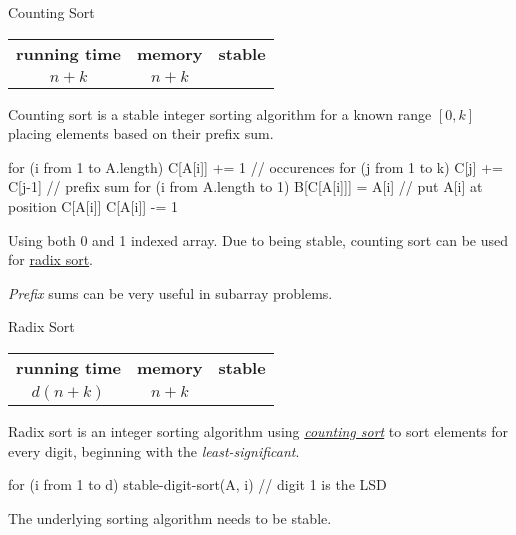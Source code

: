\documentclass{cognito}
\begin{document}
\begin{note}{Counting Sort}
	\begin{mdframed}[linecolor=black!25!white]%
	\begin{tabular}{@{} c | c | c  @{}}
		\bf running time & \bf memory & \bf stable \\
		$n + k$ & $n + k$ & \checkmark
	\end{tabular}%
	\end{mdframed}
	Counting sort is a stable integer sorting algorithm for a known range $[0, k]$
	placing elements based on their prefix sum.
	\begin{largecode}
 for (i from 1 to A.length) C[A[i]] += 1 // occurences
 for (j from 1 to k) C[j] += C[j-1] // prefix sum
 for (i from A.length to 1)
 	B[C[A[i]]] = A[i]  // put A[i] at position C[A[i]]
	C[A[i]] -= 1
	\end{largecode}
	\begin{remark} Using both 0 and 1 indexed array. Due to being stable, counting sort can be used for \hyperref[note:Radix Sort]{radix sort}.\end{remark}
	\begin{remark} \emph{Prefix} sums can be very useful in subarray problems.
	\end{remark}\vspace{-5pt}
\end{note}

\begin{note}{Radix Sort}
	\begin{mdframed}[linecolor=black!25!white]%
	\begin{tabular}{@{} c | c | c   @{}}
		\bf running time & \bf memory & \bf stable \\
		$d (n+k)$ & $n + k$ & \checkmark
	\end{tabular}%
	\end{mdframed}
	Radix sort is an integer sorting algorithm using \hyperref[note:Counting Sort]{\it counting sort}
	to sort elements for every digit, beginning with the \emph{least-significant}.
\begin{largecode}
for (i from 1 to d)
	stable-digit-sort(A, i) // digit 1 is the LSD
\end{largecode}
	\begin{remark} The underlying sorting algorithm needs to be stable.\end{remark}\vspace{-5pt}
\end{note}
\end{document}

